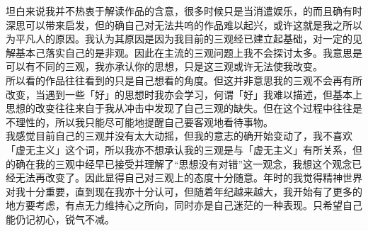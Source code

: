 \documentclass[supercite]{Experimental_Report}
\theoremstyle{definition}
\begin{document}
坦白来说我并不热衷于解读作品的含意，很多时候只是当消遣娱乐，的而且确有时深思可以带来启发，但的确自己对无法共呜的作品难以起兴，或许这就是我之所以为平凡人的原因。我认为其原因是因为我目前的三观经已建立起基础，对一定的见解基本己落实自己的是非观。因此在主流的三观问题上我不会探讨太多。我意思是可以有不同的三观，我亦承认你的思想，只是这三观或许无法使我改变。
\\所以看的作品往往看到的只是自己想看的角度。但这并非意思我的三观不会再有所改变，当遇到一些「好」的思想时我亦会学习，何谓「好」我难以描述，但基本上思想的改变往往来自于我从冲击中发现了自己三观的缺失。但在这个过程中往往是不理性的，所以我只能尽可能地提醒自己要客观地看待事物。
\\我感觉目前自己的三观并没有太大动摇，但我的意志的确开始变动了，我不喜欢「虚无主义」这个词，所以我亦不想承认我的三观是与「虚无主义」有所关系，但的确在我的三观中经早已接受并理解了“思想没有对错”这一观念，我想这个观念已经无法再改变了。因此显得自己对三观上的态度十分随意。年时的我觉得精神世界对我十分重要，直到现在我亦十分认可，但随着年纪越来越大，我开始有了更多的地方要考虑，有点无力维持心之所向，同时亦是自己迷茫的一种表现。只希望自己能仍记初心，锐气不减。
\end{document}
